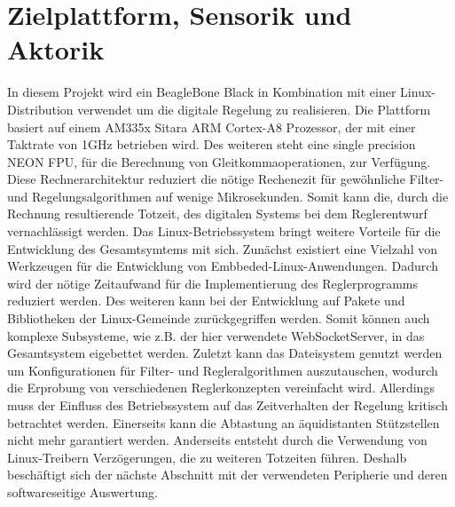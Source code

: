 \section{Zielplattform, Sensorik und Aktorik}
In diesem Projekt wird ein BeagleBone Black in Kombination mit einer Linux-Distribution verwendet um die digitale Regelung zu realisieren. Die Plattform basiert auf einem AM335x Sitara ARM Cortex-A8 Prozessor, der mit einer Taktrate von 1GHz betrieben wird. Des weiteren steht eine single precision NEON FPU, für die Berechnung von Gleitkommaoperationen, zur Verfügung. Diese Rechnerarchitektur reduziert die nötige Rechenezit für gewöhnliche Filter- und Regelungsalgorithmen auf wenige Mikrosekunden. Somit kann die, durch die Rechnung resultierende Totzeit, des digitalen Systems bei dem Reglerentwurf vernachlässigt werden.
Das Linux-Betriebssystem bringt weitere Vorteile für die Entwicklung des Gesamtsymtems mit sich. Zunächst existiert eine Vielzahl von Werkzeugen für die Entwicklung von Embbeded-Linux-Anwendungen. Dadurch wird der nötige Zeitaufwand für die Implementierung des Reglerprogramms reduziert werden. Des weiteren kann bei der Entwicklung auf Pakete und Bibliotheken der Linux-Gemeinde zurückgegriffen werden. Somit können auch komplexe Subsysteme, wie z.B. der hier verwendete WebSocketServer, in das Gesamtsystem eigebettet werden. Zuletzt kann das Dateisystem genutzt werden um Konfigurationen für Filter- und Regleralgorithmen auszutauschen, wodurch die Erprobung von verschiedenen Reglerkonzepten vereinfacht wird. 
Allerdings muss der Einfluss des Betriebssystem auf das Zeitverhalten der Regelung kritisch betrachtet werden. Einerseits kann die Abtastung an äquidistanten Stützstellen nicht mehr garantiert werden. Anderseits entsteht durch die Verwendung von Linux-Treibern Verzögerungen, die zu weiteren Totzeiten führen. Deshalb beschäftigt sich der nächste Abschnitt mit der verwendeten Peripherie und deren softwareseitige Auswertung.

